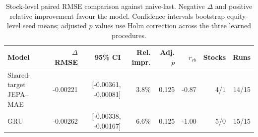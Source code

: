 \begin{table}[t]
\centering
\small
\caption{Stock-level paired RMSE comparison against naive-last. Negative $\Delta$ and positive relative improvement favour the model. Confidence intervals bootstrap equity-level seed means; adjusted $p$ values use Holm correction across the three learned procedures.}
\label{tab:paired_rmse_naive}
\begin{tabular}{lrrrrrrr}
\toprule
Model & $\Delta$RMSE & 95\% CI & Rel. impr. & Adj. $p$ & $r_{rb}$ & Stocks & Runs \\
\midrule
Shared-target JEPA--MAE & -0.00221 & [-0.00361, -0.00081] & 3.8\% & 0.125 & -0.87 & 4/1 & 14/15 \\
GRU & -0.00262 & [-0.00338, -0.00167] & 6.6\% & 0.125 & -1.00 & 5/0 & 15/15 \\
\bottomrule
\end{tabular}
\end{table}
